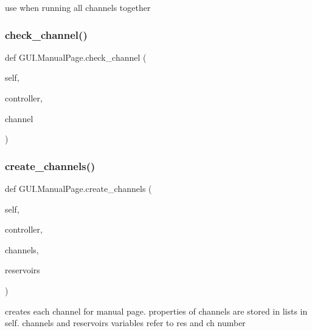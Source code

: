 \begin{DoxyVerb}use when running all channels together
\end{DoxyVerb}
 \mbox{\label{class_g_u_i_1_1_manual_page_a68aaed68e1efc88cfcf68a0830036166}} 
\subsubsection{\texorpdfstring{check\_channel()}{check\_channel()}}
{\footnotesize\ttfamily def G\+U\+I.\+Manual\+Page.\+check\+\_\+channel (\begin{DoxyParamCaption}\item[{}]{self,  }\item[{}]{controller,  }\item[{}]{channel }\end{DoxyParamCaption})}

\mbox{\label{class_g_u_i_1_1_manual_page_adaf2d13de11696b3803b541dfcc47f61}} 
\subsubsection{\texorpdfstring{create\_channels()}{create\_channels()}}
{\footnotesize\ttfamily def G\+U\+I.\+Manual\+Page.\+create\+\_\+channels (\begin{DoxyParamCaption}\item[{}]{self,  }\item[{}]{controller,  }\item[{}]{channels,  }\item[{}]{reservoirs }\end{DoxyParamCaption})}

\begin{DoxyVerb}creates each channel for manual page. properties of channels are stored in lists in self.
channels and reservoirs variables refer to res and ch number
\end{DoxyVerb}
 \mbox{\label{class_g_u_i_1_1_manual_page_a9c014c2c40c5a160ecb3e0329fa289ea}} 
